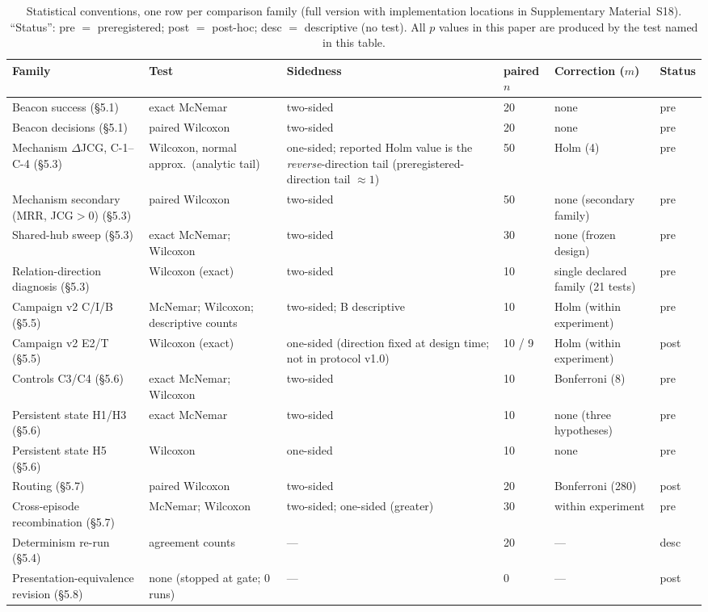 \documentclass[10pt,a4paper]{article}
\begin{document}
\begin{table}[t]
\centering\footnotesize
\caption{Statistical conventions, one row per comparison family (full version with implementation locations in Supplementary Material~S18). ``Status'': pre $=$ preregistered; post $=$ post-hoc; desc $=$ descriptive (no test). All $p$ values in this paper are produced by the test named in this table.}
\label{tab:stats}
\begin{tabular}{L{3.0cm}L{3.4cm}L{2.2cm}L{1.1cm}L{2.2cm}L{0.9cm}}
\toprule
\textbf{Family} & \textbf{Test} & \textbf{Sidedness} & \textbf{paired $n$} & \textbf{Correction ($m$)} & \textbf{Status} \\
\midrule
Beacon success (\S5.1) & exact McNemar & two-sided & 20 & none & pre \\
Beacon decisions (\S5.1) & paired Wilcoxon & two-sided & 20 & none & pre \\
Mechanism $\Delta$JCG, C-1--C-4 (\S5.3) & Wilcoxon, normal approx.\ (analytic tail) & one-sided; reported Holm value is the \emph{reverse}-direction tail (preregistered-direction tail ${\approx}1$) & 50 & Holm (4) & pre \\
Mechanism secondary (MRR, JCG${>}0$) (\S5.3) & paired Wilcoxon & two-sided & 50 & none (secondary family) & pre \\
Shared-hub sweep (\S5.3) & exact McNemar; Wilcoxon & two-sided & 30 & none (frozen design) & pre \\
Relation-direction diagnosis (\S5.3) & Wilcoxon (exact) & two-sided & 10 & single declared family (21 tests) & pre \\
Campaign v2 C/I/B (\S5.5) & McNemar; Wilcoxon; descriptive counts & two-sided; B descriptive & 10 & Holm (within experiment) & pre \\
Campaign v2 E2/T (\S5.5) & Wilcoxon (exact) & one-sided (direction fixed at design time; not in protocol v1.0) & 10 / 9 & Holm (within experiment) & post \\
Controls C3/C4 (\S5.6) & exact McNemar; Wilcoxon & two-sided & 10 & Bonferroni (8) & pre \\
Persistent state H1/H3 (\S5.6) & exact McNemar & two-sided & 10 & none (three hypotheses) & pre \\
Persistent state H5 (\S5.6) & Wilcoxon & one-sided & 10 & none & pre \\
Routing (\S5.7) & paired Wilcoxon & two-sided & 20 & Bonferroni (280) & post \\
Cross-episode recombination (\S5.7) & McNemar; Wilcoxon & two-sided; one-sided (greater) & 30 & within experiment & pre \\
Determinism re-run (\S5.4) & agreement counts & --- & 20 & --- & desc \\
Presentation-equivalence revision (\S5.8) & none (stopped at gate; 0 runs) & --- & 0 & --- & post \\
\bottomrule
\end{tabular}
\end{table}
\end{document}
